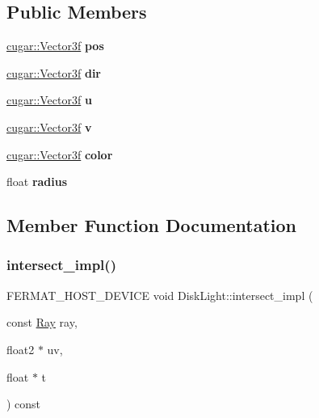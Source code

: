 \subsection*{Public Members}
\begin{DoxyCompactItemize}
\item 
\mbox{\label{struct_disk_light_ad5c2e262ab9ee8035c13825954a0197c}} 
\hyperlink{structcugar_1_1_vector}{cugar\+::\+Vector3f} {\bfseries pos}
\item 
\mbox{\label{struct_disk_light_a4026cb48e89a6f88a02f56f0f8c09e21}} 
\hyperlink{structcugar_1_1_vector}{cugar\+::\+Vector3f} {\bfseries dir}
\item 
\mbox{\label{struct_disk_light_ab13b47c395c952a7f9968be755daffd1}} 
\hyperlink{structcugar_1_1_vector}{cugar\+::\+Vector3f} {\bfseries u}
\item 
\mbox{\label{struct_disk_light_ac074e59c5a7b9a5c91a350c5de3f8a2c}} 
\hyperlink{structcugar_1_1_vector}{cugar\+::\+Vector3f} {\bfseries v}
\item 
\mbox{\label{struct_disk_light_a98efccd3799bec4ecaab15669aa84cea}} 
\hyperlink{structcugar_1_1_vector}{cugar\+::\+Vector3f} {\bfseries color}
\item 
\mbox{\label{struct_disk_light_ad652919f70f9f394dd62c07779e8ce12}} 
float {\bfseries radius}
\end{DoxyCompactItemize}


\subsection{Member Function Documentation}
\mbox{\label{struct_disk_light_a230967dac9dee2f71e7edf0b6b19f9bc}} 
\subsubsection{\texorpdfstring{intersect\+\_\+impl()}{intersect\_impl()}}
{\footnotesize\ttfamily F\+E\+R\+M\+A\+T\+\_\+\+H\+O\+S\+T\+\_\+\+D\+E\+V\+I\+CE void Disk\+Light\+::intersect\+\_\+impl (\begin{DoxyParamCaption}\item[{const \hyperlink{struct_ray}{Ray}}]{ray,  }\item[{float2 $\ast$}]{uv,  }\item[{float $\ast$}]{t }\end{DoxyParamCaption}) const\hspace{0.3cm}{\ttfamily [inline]}}

